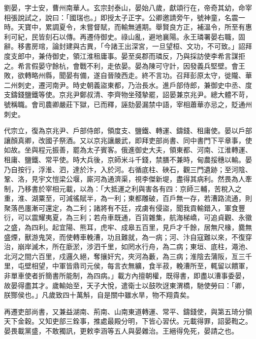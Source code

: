 
\begin{pinyinscope}

 劉晏，字士安，曹州南華人。玄宗封泰山，晏始八歲，獻頌行在，帝奇其幼，命宰相張說試之，說曰：「國瑞也。」即授太子正字。公卿邀請旁午，號神童，名震一時。天寶中，累調夏令，未嘗督賦，而輸無逋期。舉賢良方正，補溫令，所至有惠利可紀，民皆刻石以傳。再遷侍御史。祿山亂，避地襄陽。永王璘署晏右職，固辭。移書房琯，論封建與古異，「今諸王出深宮，一旦望桓、文功，不可致。」詔拜度支郎中，兼侍御史，領江淮租庸事。晏至吳郡而璘反，乃與採訪使李希言謀拒之。希言假晏守餘杭，會戰不利，走依晏。晏為陳可守計，因發義兵堅壁。會王敗，欲轉略州縣，聞晏有備，遂自晉陵西走。終不言功。召拜彭原太守，徙隴、華二州刺史，遷河南尹。時史朝義盜東都，乃治長水。進戶部侍郎，兼御史中丞、度支鑄錢鹽鐵等使。京兆尹鄭叔清、李齊物坐殘摯罷，詔晏兼京兆尹。總大體不苛，號稱職。會司農卿嚴莊下獄，已而釋，誣劾晏漏禁中語，宰相蕭華亦忌之，貶通州刺史。



 代宗立，復為京兆尹、戶部侍郎，領度支、鹽鐵、轉運、鑄錢、租庸使。晏以戶部讓顏真卿，改國子祭酒。又以京兆讓嚴武，即拜吏部尚書、同中書門下平章事，使如故。坐與程元振善，罷為太子賓客。俄進御史大夫，領東都、河南、江淮轉運、租庸、鹽鐵、常平使。時大兵後，京師米斗千錢，禁膳不兼時，甸農挼穗以輸。晏乃自按行，浮淮、泗，達於汴，入於河。右循底柱、硤石，觀三門遺跡；至河陰、鞏、洛，見宇文愷梁公堰，廝河為通濟渠，視李傑新堤，盡得其病利。然畏為人牽制，乃移書於宰相元載，以為：「大抵運之利與害各有四：京師三輔，苦稅入之重，淮、湖粟至，可減徭賦半，為一利；東都雕破，百戶無一存，若漕路流通，則聚落邑廛漸可還定，為二利；諸將有不廷，戎虜有侵盜，聞我貢輸錯入，軍食豐衍，可以震耀夷夏，為三利；若舟車既通，百貨雜集，航海梯嶠，可追貞觀、永徽之盛，為四利。起宜陽、熊耳，虎牢、成皋五百里，見戶才千餘，居無尺椽，爨無盛煙，獸游鬼哭，而使轉車輓漕，功且難就，為一病；河、汴自寇難以來，不復穿治，崩岸滅木，所在廞淤，涉泗千里，如罔水行舟，為二病；東垣、底柱，澠池、北河之間六百里，戍邏久絕，奪攘奸宄，夾河為藪，為三病；淮陰去蒲阪，亙三千里，屯壁相望，中軍皆鼎司元侯，每言衣無纊，食半菽，輓漕所至，輒留以饋軍，非單車使者折簡書所能制，為四病。」載方內擅朝權，既得書，即盡以漕事委晏，故晏得盡其才。歲輸始至，天子大悅，遣衛士以鼓吹迓東渭橋，馳使勞曰：「卿，朕酂侯也。」凡歲致四十萬斛，自是關中雖水旱，物不翔貴矣。



 再遷吏部尚書，又兼益湖南、荊南、山南東道轉運、常平、鑄錢使，與第五琦分領天下金穀。又知吏部三銓事，推處最殿分明，下皆心習伏。元載得罪，詔晏鞫之。晏畏載黨盛，不敢獨訊，更敕李涵等五人與晏雜治。王縉得免死，晏請之也。




\end{pinyinscope}
